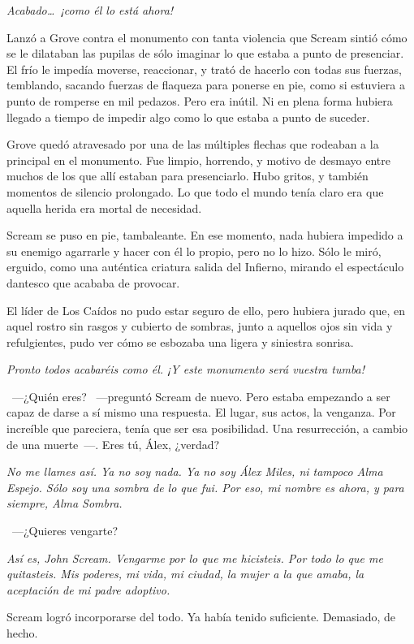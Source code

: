 \emph{Acabado\dots\ ¡como él lo está ahora!}

Lanzó a Grove contra el monumento con tanta violencia que Scream sintió cómo se le dilataban las pupilas de sólo imaginar lo que estaba a punto de presenciar. El frío le impedía moverse, reaccionar, y trató de hacerlo con todas sus fuerzas, temblando, sacando fuerzas de flaqueza para ponerse en pie, como si estuviera a punto de romperse en mil pedazos. Pero era inútil. Ni en plena forma hubiera llegado a tiempo de impedir algo como lo que estaba a punto de suceder.

Grove quedó atravesado por una de las múltiples flechas que rodeaban a la principal en el monumento. Fue limpio, horrendo, y motivo de desmayo entre muchos de los que allí estaban para presenciarlo. Hubo gritos, y también momentos de silencio prolongado. Lo que todo el mundo tenía claro era que aquella herida era mortal de necesidad.

Scream se puso en pie, tambaleante. En ese momento, nada hubiera impedido a su enemigo agarrarle y hacer con él lo propio, pero no lo hizo. Sólo le miró, erguido, como una auténtica criatura salida del Infierno, mirando el espectáculo dantesco que acababa de provocar.

El líder de Los Caídos no pudo estar seguro de ello, pero hubiera jurado que, en aquel rostro sin rasgos y cubierto de sombras, junto a aquellos ojos sin vida y refulgientes, pudo ver cómo se esbozaba una ligera y siniestra sonrisa.

\emph{Pronto todos acabaréis como él. ¡Y este monumento será vuestra tumba!}

~---¿Quién eres? ~---preguntó Scream de nuevo. Pero estaba empezando a ser capaz de darse a sí mismo una respuesta. El lugar, sus actos, la venganza. Por increíble que pareciera, tenía que ser esa posibilidad. Una resurrección, a cambio de una muerte~---. Eres tú, Álex, ¿verdad?

\emph{No me llames así. Ya no soy nada. Ya no soy Álex Miles, ni tampoco Alma Espejo. Sólo soy una sombra de lo que fui. Por eso, mi nombre es ahora, y para siempre, Alma Sombra.}

~---¿Quieres vengarte?

\emph{Así es, John Scream. Vengarme por lo que me hicisteis. Por todo lo que me quitasteis. Mis poderes, mi vida, mi ciudad, la mujer a la que amaba, la aceptación de mi padre adoptivo.}

Scream logró incorporarse del todo. Ya había tenido suficiente. Demasiado, de hecho.

